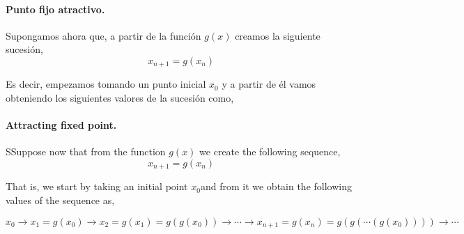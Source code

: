 \begin{paracol}{2}

\paragraph{Punto fijo atractivo.} Supongamos ahora que, a partir de la función $g(x)$ creamos la siguiente sucesión,
\begin{equation*}
x_{n+1}=g(x_n)
\end{equation*}

Es decir, empezamos tomando un punto inicial $x_0$ y a partir de él vamos obteniendo los siguientes valores de la sucesión como,
\switchcolumn

\paragraph{Attracting fixed point.}  SSuppose now that from the function $g(x)$ we create the following sequence,
\begin{equation*}
x_{n+1}=g(x_n)
\end{equation*}

That is, we start by taking an initial point $x_0$and from it we obtain the following values of the sequence as,
\end{paracol}
\begin{equation*}
x_0\rightarrow x_1=g(x_0)\rightarrow x_2=g(x_1)=g\left(g(x_0)\right) \rightarrow \cdots \rightarrow x_{n+1}=g(x_{n})=g\left( g\left( \cdots\left( g(x_0)\right)\right)\right) \rightarrow \cdots
\end{equation*}

